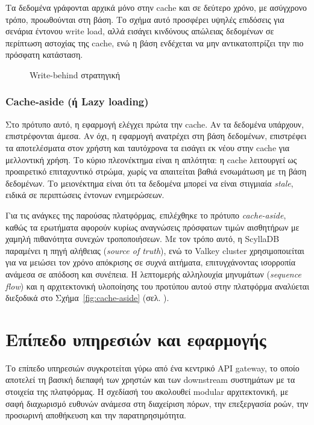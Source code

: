 Τα δεδομένα γράφονται αρχικά μόνο στην cache και σε δεύτερο χρόνο, με ασύγχρονο
τρόπο, προωθούνται στη βάση. Το σχήμα αυτό προσφέρει υψηλές επιδόσεις για
σενάρια έντονου write load, αλλά εισάγει κινδύνους απώλειας δεδομένων σε
περίπτωση αστοχίας της cache, ενώ η βάση ενδέχεται να μην αντικατοπτρίζει την
πιο πρόσφατη κατάσταση.

\begin{figure}[H]
	\centering
	\makebox[\textwidth]{%
	}
	\caption{Write-behind στρατηγική}
	\label{fig:write-behind}
\end{figure}

\subsubsection{Cache-aside (ή Lazy loading)}

Στο πρότυπο αυτό, η εφαρμογή ελέγχει πρώτα την cache. Αν τα δεδομένα υπάρχουν,
επιστρέφονται άμεσα. Αν όχι, η εφαρμογή ανατρέχει στη βάση δεδομένων,
επιστρέφει τα αποτελέσματα στον χρήστη και ταυτόχρονα τα εισάγει εκ νέου στην
cache για μελλοντική χρήση. Το κύριο πλεονέκτημα είναι η απλότητα: η cache
λειτουργεί ως προαιρετικό επιταχυντικό στρώμα, χωρίς να απαιτείται βαθιά
ενσωμάτωση με τη βάση δεδομένων. Το μειονέκτημα είναι ότι τα δεδομένα μπορεί να
είναι στιγμιαία \textit{stale}, ειδικά σε περιπτώσεις έντονων ενημερώσεων.

\medskip Για τις ανάγκες της παρούσας πλατφόρμας, επιλέχθηκε το πρότυπο
\textit{cache-aside}, καθώς τα ερωτήματα αφορούν κυρίως αναγνώσεις πρόσφατων
τιμών αισθητήρων με χαμηλή πιθανότητα συνεχών τροποποιήσεων. Με τον τρόπο αυτό,
η ScyllaDB παραμένει η πηγή αλήθειας (\textit{source of truth}), ενώ το Valkey
cluster χρησιμοποιείται για να μειώσει τον χρόνο απόκρισης σε συχνά αιτήματα,
επιτυγχάνοντας ισορροπία ανάμεσα σε απόδοση και συνέπεια. Η λεπτομερής
αλληλουχία μηνυμάτων (\textit{sequence flow}) και η αρχιτεκτονική υλοποίησης
του προτύπου αυτού στην πλατφόρμα αναλύεται διεξοδικά στο
Σχήμα~\ref{fig:cache-aside} (σελ. \pageref{fig:cache-aside}).

\section{Επίπεδο υπηρεσιών και εφαρμογής}

Το επίπεδο υπηρεσιών συγκροτείται γύρω από ένα κεντρικό API gateway, το οποίο
αποτελεί τη βασική διεπαφή των χρηστών και των downstream συστημάτων με τα
στοιχεία της πλατφόρμας. Η σχεδίασή του ακολουθεί modular αρχιτεκτονική, με
σαφή διαχωρισμό ευθυνών ανάμεσα στη διαχείριση πόρων, την επεξεργασία ροών, την
προσωρινή αποθήκευση και την παρατηρησιμότητα.


